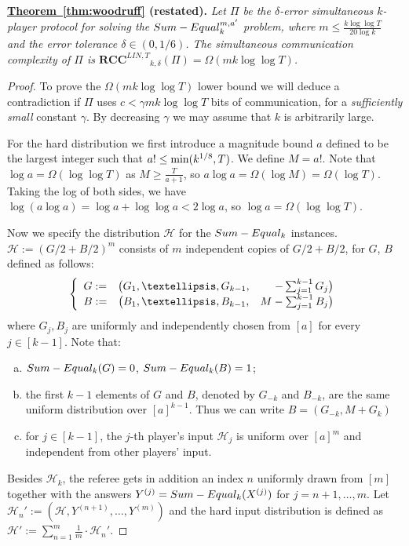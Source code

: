 \documentclass[11pt]{article}
\numberwithin{equation}{section}
\theoremstyle{definition}
\theoremstyle{plain}
\newcommand{\expref}[2]{\hyperref[#2]{#1~\ref{#2}}}
\newcommand{\error}{\ensuremath{\delta}}
\newcommand{\bigomega}[1]{\ensuremath{{\Omega \left( {#1} \right)}}}
\newcommand{\eqdef}{\ensuremath{:=}}
\newcommand{\rcclinT}{\ensuremath{\mathbf{RCC}^{LIN,T}}}
\newcommand{\sumequal}{\textsc{Sum-Equal} }
\begin{document}
\noindent\textbf{\expref{Theorem}{thm:woodruff} (restated).} 
{\it
	Let $\Pi$ be the $\error$-error simultaneous $k$-player protocol for solving the $\sumequal_k^{m,a'}$ problem, where 
	$m \le\frac{k\log\log T}{20\log k}$ and the error tolerance $\error \in (0,1/6)$.
	The simultaneous communication complexity of $\Pi$ is $\rcclinT_{k,\error}(\Pi)=\bigomega{mk\log\log T}$.
}
\medskip
\begin{proof}
	To prove the $\bigomega{mk\log\log T}$ lower bound we will deduce a contradiction if $\Pi$ uses $c<\gamma mk\log\log T$ bits of communication, for a \emph{sufficiently small} constant $\gamma$.
	By decreasing $\gamma$ we may assume that $k$ is arbitrarily large.

	For the hard distribution we first introduce a magnitude bound $a$ defined to be the largest integer such that $a! \le {\color{black}\min(k^{1/8},T)}$. We define $M = a!$. {\color{black}Note that $\log a = \Omega(\log\log T)$ as $M \ge \frac{T}{a+1}$, so $a \log a = \Omega(\log M) = \Omega(\log T)$. Taking the log of both sides, we have $\log(a \log a) = \log a + \log \log a < 2\log a$, so $\log a = \Omega(\log \log T)$.}


	Now we specify the distribution $\mathcal{H}$ for the $\sumequal_k$ instances.
	$\mathcal{H} \eqdef \left(G/2+B/2\right)^m$ consists of $m$ independent copies of $G/2+B/2$,
	for $G$, $B$ defined as follows:
	$$
		\left\{
		\begin{array}{c c r}
			G \eqdef &	\big( G_1,\dots, G_{k-1} , &-\sum_{j=1}^{k-1} G_j \big)		\\
			B \eqdef &  \big( B_1,\dots, B_{k-1} , &M-\sum_{j=1}^{k-1} B_j \big)
		\end{array}		
		\right.
	$$
	where $G_j,B_j$ are uniformly and independently chosen from $[a]$ for every $j\in[k-1]$. 
	Note that:
	{\color{black}
	\begin{enumerate}[(a)]
	    \item $\sumequal_{k}(G)=0$, $\sumequal_{k}(B)=1$; 
	    \item the first $k-1$ elements of $G$ and $B$, denoted by $G_{-k}$ and $B_{-k}$, are the same uniform distribution over $[a]^{k-1}$. Thus we can write $B=(G_{-k},M+G_k)$
	    \item for $j\in[k-1]$, the $j$-th player's input $\mathcal{H}_j$ is uniform over $[a]^m$ and independent from other players' input.
	\end{enumerate}
}
	Besides $\mathcal{H}_k$, the referee gets in addition an index $n$ uniformly drawn from $[m]$ together with the answers $Y^{(j)}=\sumequal_k(X^{(j)})$ for $j=n+1,\ldots,m$.
	Let $\mathcal{H}_n'\eqdef (\mathcal{H},Y^{(n+1)},\ldots,Y^{(m)})$
	and the hard input distribution is defined as $\mathcal{H}'\eqdef %
	\sum_{n=1}^m \frac{1}{m}\cdot \mathcal{H}_n'$.
	


\end{proof}
\end{document}
